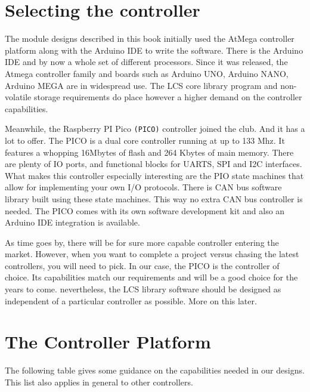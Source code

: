 \section{Selecting the controller}

The module designs described in this book initially used the AtMega controller platform along with the Arduino IDE to write the software. There is the Arduino IDE and by now a whole set of different processors. Since it was released, the Atmega controller family and boards such as Arduino UNO, Arduino NANO, Arduino MEGA are in widespread use. The LCS core library program and non-volatile storage requirements do place however a higher demand on the controller capabilities.

Meanwhile, the Raspberry PI Pico \texttt{(PICO)} controller joined the club. And it has a lot to offer. The PICO is a dual core controller running at up to 133 Mhz. It features a whopping 16Mbytes of flash and 264 Kbytes of main memory. There are plenty of IO ports, and functional blocks for UARTS, SPI and I2C interfaces. What makes this controller especially interesting are the PIO state machines that allow for implementing your own I/O protocols. There is CAN bus software library built using these state machines. This way no extra CAN bus controller is needed. The PICO comes with its own software development kit and also an Arduino IDE integration is available.

As time goes by, there will be for sure more capable controller entering the market. However, when you want to complete a project versus chasing the latest controllers, you will need to pick. In our case, the PICO is the controller of choice. Its capabilities match our requirements and will be a good choice for the years to come. nevertheless, the LCS library software should be designed as independent of a particular controller as possible. More on this later. 

\section{The Controller Platform}

 The following table gives some guidance on the capabilities needed in our designs. This list also applies in general to other controllers.

